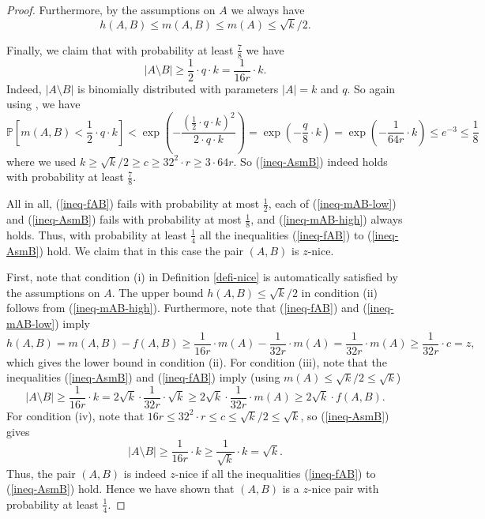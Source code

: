 \documentclass[11pt]{article}
\theoremstyle{definition}
\numberwithin{equation}{section}
\begin{document}
\begin{proof}
Furthermore, by the assumptions on $A$ we always have
\begin{equation}\label{ineq-mAB-high}
h(A,B)\leq m(A,B)\leq m(A)\leq \sqrt{k}/2.
\end{equation}

Finally, we claim that with probability at least $\frac{7}{8}$ we have
\begin{equation}\label{ineq-AsmB}
\vert A\setminus B\vert\geq \frac{1}{2}\cdot q \cdot k=\frac{1}{16r}\cdot k.
\end{equation}
Indeed, $\vert A\setminus B\vert$ is binomially distributed with parameters $\vert A\vert=k$ and $q$. So again using \cite[Theorem A.1.13]{alon-spencer}, we have 
\[\mathbb{P}\left[m(A,B)< \frac{1}{2}\cdot q \cdot k\right]<\exp\left(-\frac{\left(\frac{1}{2}\cdot q \cdot k\right)^2}{2\cdot q\cdot k}\right)=\exp\left(-\frac{q}{8}\cdot k\right)=\exp\left(-\frac{1}{64r}\cdot k\right)\leq e^{-3}\leq \frac{1}{8}\]
where we used $k\geq \sqrt{k}/2\geq c\geq 32^2\cdot r\geq 3\cdot 64r$. So (\ref{ineq-AsmB}) indeed holds with probability at least $\frac{7}{8}$.

All in all, (\ref{ineq-fAB}) fails with probability at most $\frac{1}{2}$,  each of (\ref{ineq-mAB-low}) and  (\ref{ineq-AsmB}) fails with probability at most $\frac{1}{8}$, and (\ref{ineq-mAB-high}) always holds. Thus, with probability at least $\frac{1}{4}$ all the inequalities (\ref{ineq-fAB}) to (\ref{ineq-AsmB}) hold. We claim that in this case the pair $(A,B)$ is $z$-nice.

First, note that condition (i) in Definition \ref{defi-nice} is automatically satisfied by the assumptions on $A$. The upper bound $h(A,B)\leq \sqrt{k}/2$ in condition (ii) follows from (\ref{ineq-mAB-high}). Furthermore, note that (\ref{ineq-fAB}) and (\ref{ineq-mAB-low}) imply
\[h(A,B)=m(A,B)-f(A,B)\geq \frac{1}{16r}\cdot m(A)-\frac{1}{32r}\cdot m(A)=\frac{1}{32r}\cdot m(A)\geq \frac{1}{32r}\cdot c=z,\]
which gives the lower bound in condition (ii). For condition (iii), note that the inequalities (\ref{ineq-AsmB}) and (\ref{ineq-fAB}) imply (using $m(A)\leq \sqrt{k}/2\leq \sqrt{k}$)
\[\vert A\setminus B\vert\geq \frac{1}{16r}\cdot k=2\sqrt{k}\cdot \frac{1}{32r}\cdot \sqrt{k}\geq 
2\sqrt{k}\cdot \frac{1}{32r}\cdot m(A)\geq 2\sqrt{k}\cdot f(A,B).\]
For condition (iv), note that $16r\leq 32^2\cdot r\leq c\leq \sqrt{k}/2\leq \sqrt{k}$, so (\ref{ineq-AsmB}) gives
\[\vert A\setminus B\vert\geq \frac{1}{16r}\cdot k\geq \frac{1}{\sqrt{k}}\cdot k=\sqrt{k}.\]
Thus, the pair $(A,B)$ is indeed $z$-nice if all the inequalities (\ref{ineq-fAB}) to (\ref{ineq-AsmB}) hold. Hence we have shown that $(A,B)$ is a $z$-nice pair with probability at least $\frac{1}{4}$.
\end{proof}
\end{document}
